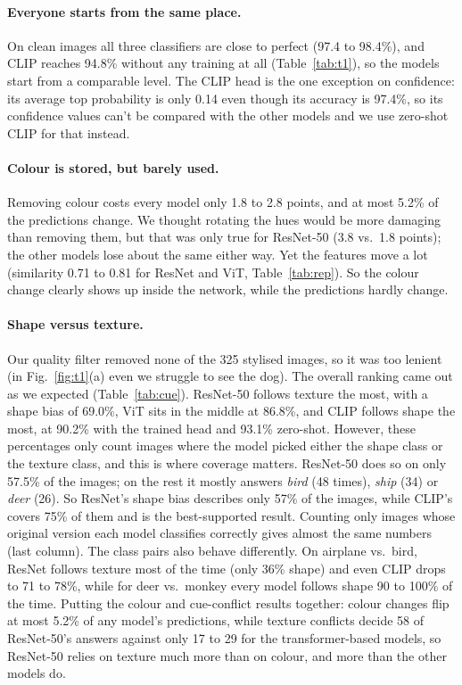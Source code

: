 \documentclass{article}
\begin{document}
\paragraph{Everyone starts from the same place.} On clean images all three classifiers are close to perfect (97.4 to 98.4\%), and CLIP reaches 94.8\% without any training at all (Table~\ref{tab:t1}), so the models start from a comparable level. The CLIP head is the one exception on confidence: its average top probability is only 0.14 even though its accuracy is 97.4\%, so its confidence values can't be compared with the other models and we use zero-shot CLIP for that instead.

\paragraph{Colour is stored, but barely used.} Removing colour costs every model only 1.8 to 2.8 points, and at most 5.2\% of the predictions change. We thought rotating the hues would be more damaging than removing them, but that was only true for ResNet-50 (3.8 vs.\ 1.8 points); the other models lose about the same either way. Yet the features move a lot (similarity 0.71 to 0.81 for ResNet and ViT, Table~\ref{tab:rep}). So the colour change clearly shows up inside the network, while the predictions hardly change.

\paragraph{Shape versus texture.} Our quality filter removed none of the 325 stylised images, so it was too lenient (in Fig.~\ref{fig:t1}(a) even we struggle to see the dog). The overall ranking came out as we expected (Table~\ref{tab:cue}). ResNet-50 follows texture the most, with a shape bias of 69.0\%, ViT sits in the middle at 86.8\%, and CLIP follows shape the most, at 90.2\% with the trained head and 93.1\% zero-shot. However, these percentages only count images where the model picked either the shape class or the texture class, and this is where coverage matters. ResNet-50 does so on only 57.5\% of the images; on the rest it mostly answers \emph{bird} (48 times), \emph{ship} (34) or \emph{deer} (26). So ResNet's shape bias describes only 57\% of the images, while CLIP's covers 75\% of them and is the best-supported result. Counting only images whose original version each model classifies correctly gives almost the same numbers (last column). The class pairs also behave differently. On airplane vs.\ bird, ResNet follows texture most of the time (only 36\% shape) and even CLIP drops to 71 to 78\%, while for deer vs.\ monkey every model follows shape 90 to 100\% of the time. Putting the colour and cue-conflict results together: colour changes flip at most 5.2\% of any model's predictions, while texture conflicts decide 58 of ResNet-50's answers against only 17 to 29 for the transformer-based models, so ResNet-50 relies on texture much more than on colour, and more than the other models do.
\end{document}
